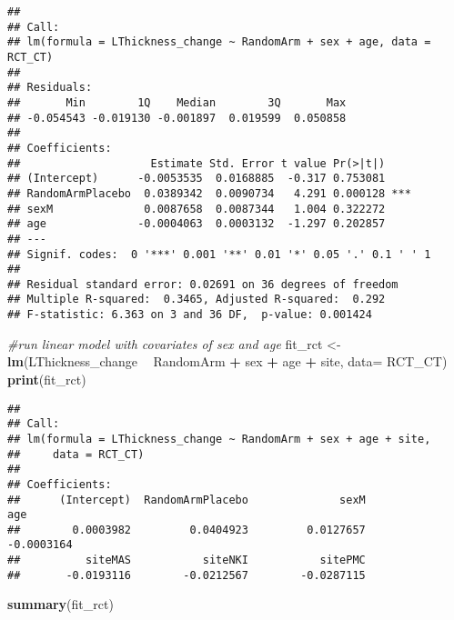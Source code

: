 \documentclass[]{article}
\newenvironment{Shaded}{\begin{snugshade}}{\end{snugshade}}
\newcommand{\KeywordTok}[1]{\textcolor[rgb]{0.13,0.29,0.53}{\textbf{#1}}}
\newcommand{\DataTypeTok}[1]{\textcolor[rgb]{0.13,0.29,0.53}{#1}}
\newcommand{\StringTok}[1]{\textcolor[rgb]{0.31,0.60,0.02}{#1}}
\newcommand{\CommentTok}[1]{\textcolor[rgb]{0.56,0.35,0.01}{\textit{#1}}}
\newcommand{\OperatorTok}[1]{\textcolor[rgb]{0.81,0.36,0.00}{\textbf{#1}}}
\newcommand{\NormalTok}[1]{#1}
\theoremstyle{definition}
\theoremstyle{definition}
\theoremstyle{definition}
\theoremstyle{remark}
\begin{document}
\begin{verbatim}
## 
## Call:
## lm(formula = LThickness_change ~ RandomArm + sex + age, data = RCT_CT)
## 
## Residuals:
##       Min        1Q    Median        3Q       Max 
## -0.054543 -0.019130 -0.001897  0.019599  0.050858 
## 
## Coefficients:
##                    Estimate Std. Error t value Pr(>|t|)    
## (Intercept)      -0.0053535  0.0168885  -0.317 0.753081    
## RandomArmPlacebo  0.0389342  0.0090734   4.291 0.000128 ***
## sexM              0.0087658  0.0087344   1.004 0.322272    
## age              -0.0004063  0.0003132  -1.297 0.202857    
## ---
## Signif. codes:  0 '***' 0.001 '**' 0.01 '*' 0.05 '.' 0.1 ' ' 1
## 
## Residual standard error: 0.02691 on 36 degrees of freedom
## Multiple R-squared:  0.3465, Adjusted R-squared:  0.292 
## F-statistic: 6.363 on 3 and 36 DF,  p-value: 0.001424
\end{verbatim}

\begin{Shaded}
\begin{Highlighting}[]
\CommentTok{#run linear model with covariates of sex and age}
\NormalTok{  fit_rct <-}\StringTok{ }\KeywordTok{lm}\NormalTok{(LThickness_change }\OperatorTok{~}\StringTok{ }\NormalTok{RandomArm }\OperatorTok{+}\StringTok{ }\NormalTok{sex }\OperatorTok{+}\StringTok{ }\NormalTok{age }\OperatorTok{+}\StringTok{ }\NormalTok{site, }\DataTypeTok{data=}\NormalTok{ RCT_CT)}
  \KeywordTok{print}\NormalTok{(fit_rct)}
\end{Highlighting}
\end{Shaded}

\begin{verbatim}
## 
## Call:
## lm(formula = LThickness_change ~ RandomArm + sex + age + site, 
##     data = RCT_CT)
## 
## Coefficients:
##      (Intercept)  RandomArmPlacebo              sexM               age  
##        0.0003982         0.0404923         0.0127657        -0.0003164  
##          siteMAS           siteNKI           sitePMC  
##       -0.0193116        -0.0212567        -0.0287115
\end{verbatim}

\begin{Shaded}
\begin{Highlighting}[]
  \KeywordTok{summary}\NormalTok{(fit_rct)}
\end{Highlighting}
\end{Shaded}
\end{document}
